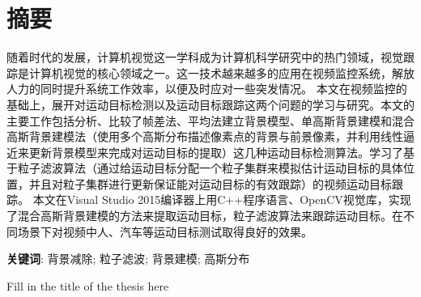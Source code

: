 \documentclass[UTF8, twoside]{ctexart}
\begin{document}
\titlespacing*{\section}{0pt}{0pt}{0pt}
\vspace*{0.6cm}
\section*{摘\quad 要}
\vspace*{0.2cm}
随着时代的发展，计算机视觉这一学科成为计算机科学研究中的热门领域，视觉跟踪是计算机视觉的核心领域之一。这一技术越来越多的应用在视频监控系统，解放人力的同时提升系统工作效率，以便及时应对一些突发情况。
本文在视频监控的基础上，展开对运动目标检测以及运动目标跟踪这两个问题的学习与研究。本文的主要工作包括分析、比较了帧差法、平均法建立背景模型、单高斯背景建模和混合高斯背景建模法（使用多个高斯分布描述像素点的背景与前景像素，并利用线性逼近来更新背景模型来完成对运动目标的提取）这几种运动目标检测算法。学习了基于粒子滤波算法（通过给运动目标分配一个粒子集群来模拟估计运动目标的具体位置，并且对粒子集群进行更新保证能对运动目标的有效跟踪）的视频运动目标跟踪。
本文在Visual Studio 2015编译器上用C++程序语言、OpenCV视觉库，实现了混合高斯背景建模的方法来提取运动目标，粒子滤波算法来跟踪运动目标。在不同场景下对视频中人、汽车等运动目标测试取得良好的效果。

\vspace{1.4em}
\noindent\textbf{关键词}: 背景减除; 粒子滤波; 背景建模; 高斯分布
\newpage\cleardoublepage

\begingroup
\centering %
\arialfont\bfseries %
\fontsize{14}{16}\selectfont %
\parbox{0.8\textwidth}{\centering
    Fill in the title of the thesis here
}\par
\endgroup

\vspace*{1cm}
\end{document}
